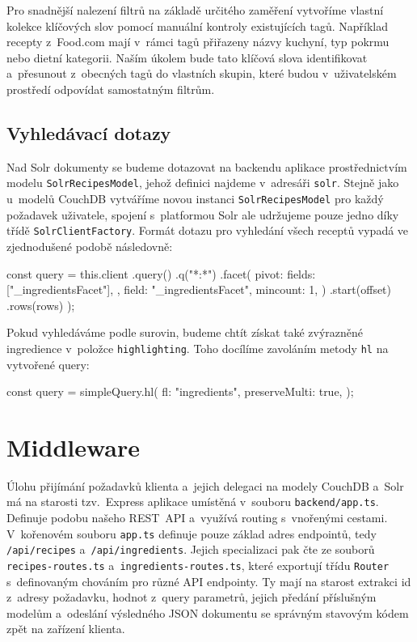 Pro snadnější nalezení filtrů na základě určitého zaměření vytvoříme vlastní kolekce klíčových slov pomocí manuální kontroly existujících tagů. Například recepty z~Food.com mají v~rámci tagů přiřazeny názvy kuchyní, typ pokrmu nebo dietní kategorii. Naším úkolem bude tato klíčová slova identifikovat a~přesunout z~obecných tagů do vlastních skupin, které budou v~uživatelském prostředí odpovídat samostatným filtrům.

\subsection{Vyhledávací dotazy}

Nad Solr dokumenty se budeme dotazovat na backendu aplikace prostřednictvím modelu \texttt{SolrRecipesModel}, jehož definici najdeme v~adresáři \texttt{solr}. Stejně jako u~modelů CouchDB vytváříme novou instanci \texttt{SolrRecipesModel} pro každý požadavek uživatele, spojení s~platformou Solr ale udržujeme pouze jedno díky třídě \texttt{SolrClientFactory}. Formát dotazu pro vyhledání všech receptů vypadá ve zjednodušené podobě následovně:
\begingroup
\samepage
\begin{code}
const query = this.client
  .query()
  .q("*:*")
  .facet({
    pivot: {
      fields: ["_ingredientsFacet"],
    },
    field: "_ingredientsFacet",
    mincount: 1,
  })
  .start(offset)
  .rows(rows)
);
\end{code}
\endgroup

Pokud vyhledáváme podle surovin, budeme chtít získat také zvýrazněné ingredience v~položce \texttt{highlighting}. Toho docílíme zavoláním metody \texttt{hl} na vytvořené query:
\begingroup
\samepage
\begin{code}
const query = simpleQuery.hl({
  fl: "ingredients",
  preserveMulti: true,
});
\end{code}
\endgroup

\section{Middleware}

Úlohu přijímání požadavků klienta a~jejich delegaci na modely CouchDB a~Solr má na starosti tzv.~Express aplikace umístěná v~souboru \texttt{backend/app.ts}. Definuje podobu našeho REST~API a~využívá routing s~vnořenými cestami. V~kořenovém souboru \texttt{app.ts} definuje pouze základ adres endpointů, tedy \texttt{/api/recipes} a~\texttt{/api/ingredients}. Jejich specializaci pak čte ze souborů \texttt{recipes-routes.ts} a~\texttt{ingredients-routes.ts}, které exportují třídu \texttt{Router} s~definovaným chováním pro různé API endpointy. Ty mají na starost extrakci id z~adresy požadavku, hodnot z~query parametrů, jejich předání příslušným modelům a~odeslání výsledného JSON dokumentu se správným stavovým kódem zpět na zařízení klienta.

